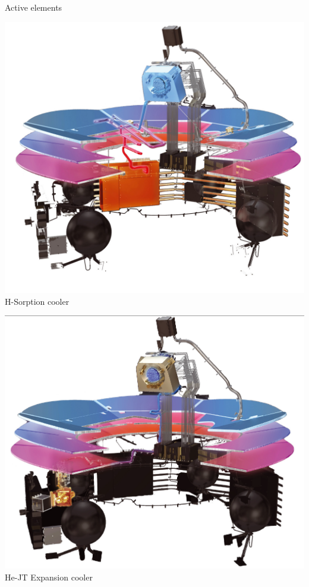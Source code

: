 \documentclass{cubeamer}
\begin{document}
\begin{frame}{Active elements}
\begin{minipage}{0.3\textwidth}
    \includegraphics[width=0.9\linewidth]{Figures/H_sorption_cooler.png} 
    \small \centering  H-Sorption cooler
\end{minipage}
\begin{minipage}{0.3\textwidth}
    \includegraphics[width=0.9\linewidth]{Figures/He_JT_cooler.png} 
    \small \centering  He-JT Expansion cooler
\end{minipage}
\begin{minipage}{0.3\textwidth}

\end{minipage}
\end{frame}
\end{document}

